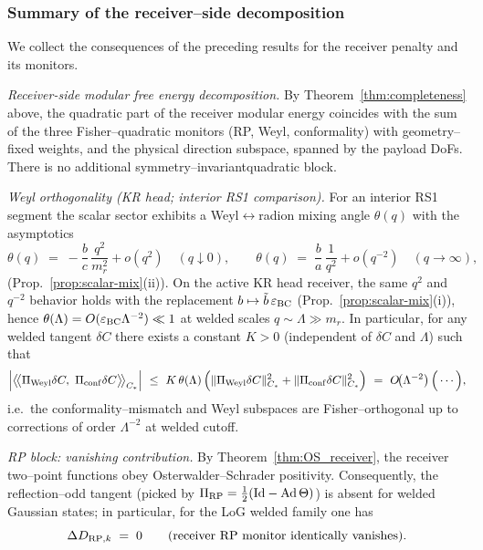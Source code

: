 \documentclass[10pt]{article}
\theoremstyle{definition}
\theoremstyle{plain}
\begin{document}
\subsubsection*{Summary of the receiver–side decomposition}\label{subsubsec:uom-main-008}

We collect the consequences of the preceding results for the receiver penalty and its monitors.

\medskip
\noindent
\emph{Receiver-side modular free energy decomposition.} By Theorem~\ref{thm:completeness} above, the quadratic part
of the receiver modular energy coincides with the sum of the three Fisher–quadratic monitors
(RP, Weyl, conformality) with geometry–fixed weights, and the physical direction subspace, spanned by the payload DoFs. There is no additional symmetry–invariantquadratic block. 


\medskip
\noindent
\emph{Weyl orthogonality (KR head; interior RS1 comparison).} For an interior RS1 segment the scalar sector
exhibits a Weyl$\leftrightarrow$radion mixing angle $\theta(q)$ with the asymptotics
\[
\theta(q)\;=\;-\frac{b}{c}\,\frac{q^{2}}{m_r^{2}}+o(q^{2})\quad(q\downarrow 0),
\qquad
\theta(q)\;=\;\frac{b}{a}\,\frac{1}{q^{2}}+o(q^{-2})\quad(q\to\infty),
\]
(Prop.~\ref{prop:scalar-mix}(ii)). On the active KR head receiver, the same $q^2$ and $q^{-2}$ behavior holds
with the replacement $b\mapsto \tilde b\,\varepsilon_{\rm BC}$ (Prop.~\ref{prop:scalar-mix}(i)), hence
$\theta(\Lambda)=O(\varepsilon_{\rm BC}\Lambda^{-2})\ll 1$ at welded scales $q\sim\Lambda\gg m_r$. In particular,
for any welded tangent $\delta C$ there exists a constant $K>0$ (independent of $\delta C$ and $\Lambda$) such that
\begin{equation}
\label{eq:near-orth}
\Big|\big\langle\!\big\langle \Pi_{\rm Weyl}\delta C,\ \Pi_{\rm conf}\delta C\big\rangle\!\big\rangle_{C_\ast}\Big|
\ \le\ K\,\theta(\Lambda)\,\Big(\|\Pi_{\rm Weyl}\delta C\|_{C_\ast}^{2}+\|\Pi_{\rm conf}\delta C\|_{C_\ast}^{2}\Big)
\ =\ O\!\big(\Lambda^{-2}\big)\,\Big(\cdots\Big),
\end{equation}
i.e.\ the conformality–mismatch and Weyl subspaces are Fisher–orthogonal up to corrections of order
$\Lambda^{-2}$ at welded cutoff.

\medskip
\noindent
\emph{RP block: vanishing contribution.} By Theorem~\ref{thm:OS_receiver}, the receiver two–point functions
obey Osterwalder–Schrader positivity. Consequently, the reflection–odd tangent (picked by
$\Pi_{\rm RP}=\tfrac12(\mathrm{Id}-\mathrm{Ad}\,\Theta)$) is absent for welded Gaussian states; in
particular, for the LoG welded family one has
\begin{equation}
\label{eq:rp-vanish}
\Delta D_{{\rm RP},k}\;=\;0\qquad\text{(receiver RP monitor identically vanishes).}
\end{equation}
\end{document}
